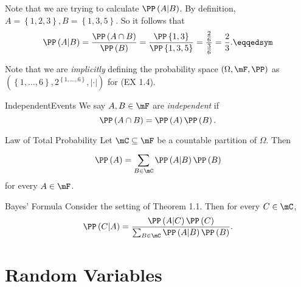 \documentclass[stat333]{subfiles}
\begin{document}
    \begin{subproof}[Answer]
        Note that we are trying to calculate $\PP\left( A|B \right)$. By definition, $A=\left\lbrace 1,2,3 \right\rbrace, B=\left\lbrace 1,3,5 \right\rbrace$. So it follows that
        \begin{equation*}
            \PP\left( A|B \right) = \frac{\PP\left( A\cap B \right) }{\PP\left( B \right) } = \frac{\PP\left\lbrace 1,3 \right\rbrace }{\PP\left\lbrace 1,3,5 \right\rbrace } = \frac{\frac{2}{6}}{\frac{3}{6}} = \frac{2}{3}. \eqqedsym
        \end{equation*}
    \end{subproof}

    \noindent Note that we are \textit{implicitly} defining the probability space $\left( \Omega,\mF,\PP \right)$ as $\left( \left\lbrace 1,\ldots,6 \right\rbrace , 2^{\left\lbrace 1,\ldots,6 \right\rbrace }, \left| \cdot \right|  \right)$ for (EX 1.4).

    \begin{definition}{Independent}{Events}
        We say $A,B\in\mF$ are \emph{independent} if
        \begin{equation*}
            \PP\left( A\cap B \right) = \PP\left( A \right) \PP\left( B \right) .
        \end{equation*}
    \end{definition}

    \begin{theorem}{Law of Total Probability}
        Let $\mC\subseteq\mF$ be a countable partition of $\Omega$. Then
        \begin{equation*}
            \PP\left( A \right) = \sum^{}_{B\in\mC} \PP\left( A|B \right) \PP\left( B \right) 
        \end{equation*}
        for every $A\in\mF$.
    \end{theorem}

    \begin{cor}{Bayes' Formula}
        Consider the setting of Theorem 1.1. Then for every $C\in\mC$,
        \begin{equation*}
            \PP\left( C|A \right) = \frac{\PP\left( A|C \right) \PP\left( C \right) }{\sum^{}_{B\in\mC}\PP\left( A|B \right) \PP\left( B \right)  }.
        \end{equation*}
    \end{cor}	

    \section{Random Variables}
\end{document}
